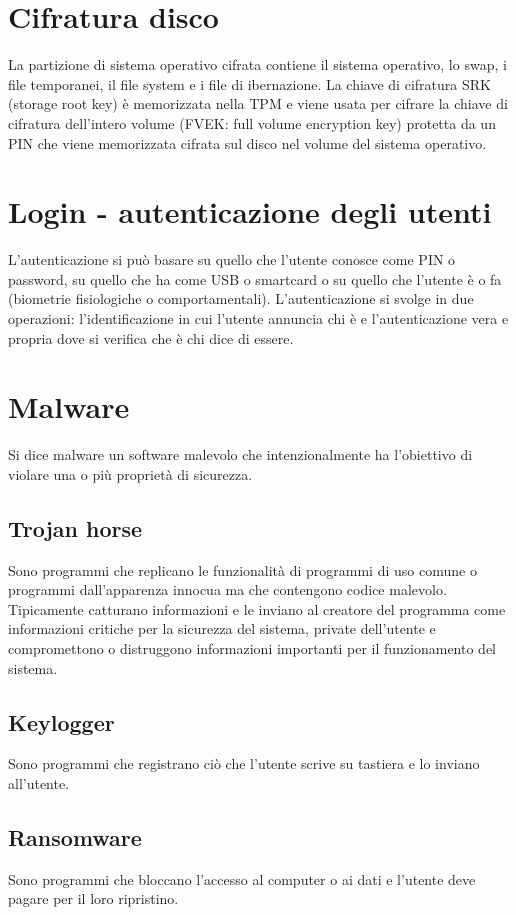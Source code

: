 \section{Cifratura disco}
La partizione di sistema operativo cifrata contiene il sistema operativo, lo swap, i file temporanei, il file system e i file di ibernazione. La chiave di cifratura SRK (storage root
key) \`e memorizzata nella TPM e viene usata per cifrare la chiave di cifratura dell'intero volume (FVEK: full volume encryption key) protetta da un PIN che viene memorizzata cifrata
sul disco nel volume del sistema operativo. 
\section{Login - autenticazione degli utenti}
L'autenticazione si pu\`o basare su quello che l'utente conosce come PIN o password, su quello che ha come USB o smartcard o su quello che l'utente \`e o fa (biometrie fisiologiche o 
comportamentali). L'autenticazione si svolge in due operazioni: l'identificazione in cui l'utente annuncia chi \`e e l'autenticazione vera e propria dove si verifica che \`e chi dice di
essere.
\section{Malware}
Si dice malware un software malevolo che intenzionalmente ha l'obiettivo di violare una o pi\`u propriet\`a di sicurezza.
\subsection{Trojan horse}
Sono programmi che replicano le funzionalit\`a di programmi di uso comune o programmi dall'apparenza innocua ma che contengono codice malevolo. Tipicamente catturano informazioni e le 
inviano al creatore del programma come informazioni critiche per la sicurezza del sistema, private dell'utente e compromettono o distruggono informazioni importanti per il funzionamento
del sistema. 
\subsection{Keylogger}
Sono programmi che registrano ci\`o che l'utente scrive su tastiera e lo inviano all'utente.
\subsection{Ransomware}
Sono programmi che bloccano l'accesso al computer o ai dati e l'utente deve pagare per il loro ripristino. 
